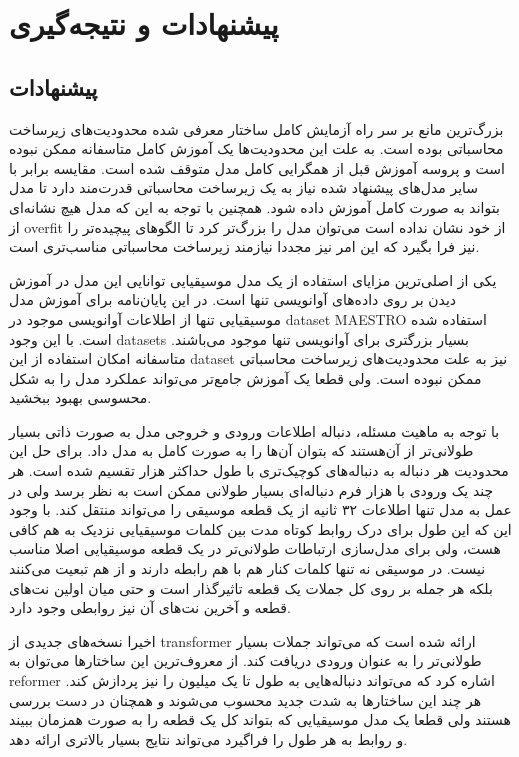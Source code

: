 \chapter{پیشنهادات و نتیجه‌گیری}
\section{پیشنهادات}
بزرگ‌ترین مانع بر سر راه آزمایش کامل ساختار معرفی شده محدودیت‌های زیرساخت
محاسباتی بوده است. به علت این محدودیت‌ها یک آموزش کامل متاسفانه ممکن نبوده است و
پروسه آموزش قبل از همگرایی کامل مدل متوقف شده است. مقایسه برابر با سایر مدل‌های
پیشنهاد شده نیاز به یک زیرساخت محاسباتی قدرت‌مند دارد تا مدل بتواند به صورت کامل
آموزش داده شود. همچنین با توجه به این که مدل هیچ نشانه‌ای از \gls{overfit} از
خود نشان نداده است می‌توان مدل را بزرگ‌تر کرد تا الگوهای پیچیده‌تر را نیز فرا
بگیرد که این امر نیز مجددا نیازمند زیرساخت محاسباتی مناسب‌تری است.

یکی از اصلی‌ترین مزایای استفاده از یک مدل موسیقیایی توانایی این مدل در آموزش
دیدن بر روی داده‌های آوانویسی تنها است. در این پایان‌نامه برای آموزش مدل
موسیقیایی تنها از اطلاعات آوانویسی موجود در \gls{dataset} MAESTRO استفاده شده
است. با این وجود \glspl{dataset} بسیار بزرگتری برای آوانویسی تنها موجود
می‌باشند. متاسفانه امکان استفاده از این \gls{dataset} نیز به علت محدودیت‌های
زیرساخت محاسباتی ممکن نبوده است. ولی قطعا یک آموزش جامع‌تر می‌تواند عملکرد مدل
را به شکل محسوسی بهبود ببخشید.

با توجه به ماهیت مسئله، دنباله اطلاعات ورودی و خروجی مدل به صورت ذاتی بسیار
طولانی‌تر از آن‌هستند که بتوان آن‌ها را به صورت کامل به مدل داد. برای حل این
محدودیت هر دنباله به دنباله‌های کوچیک‌تری با طول حداکثر هزار تقسیم شده است. هر
چند یک ورودی با هزار فرم دنباله‌ای بسیار طولانی ممکن است به نظر برسد ولی در عمل
به مدل تنها اطلاعات ۳۲ ثانیه از یک قطعه موسیقی را می‌تواند منتقل کند. با وجود
این که این طول برای درک روابط کوتاه مدت بین کلمات موسیقیایی نزدیک به هم کافی
هست، ولی برای مدل‌سازی ارتباطات طولانی‌تر در یک قطعه موسیقیایی اصلا مناسب
نیست. در موسیقی نه تنها کلمات کنار هم با هم رابطه دارند و از هم تبعیت
می‌کنند بلکه هر جمله بر روی کل جملات یک قطعه تاثیرگذار است و حتی میان اولین
نت‌های قطعه و آخرین نت‌های آن نیز روابطی وجود دارد.

اخیرا نسخه‌های جدیدی از \gls{transformer} ارائه شده است که می‌تواند جملات بسیار
طولانی‌تر را به عنوان ورودی دریافت کند. از معروف‌ترین این ساختارها می‌توان به
reformer \cite{kitaev2020reformer} اشاره کرد که می‌تواند دنباله‌هایی به طول تا
یک میلیون را نیز پردازش کند. هر چند این ساختارها به شدت جدید محسوب می‌شوند و
همچنان در دست بررسی هستند ولی قطعا یک مدل موسیقیایی که بتواند کل یک قطعه را به
صورت همزمان ببیند و روابط به هر طول را فراگیرد می‌تواند نتایج بسیار بالاتری
ارائه دهد.

